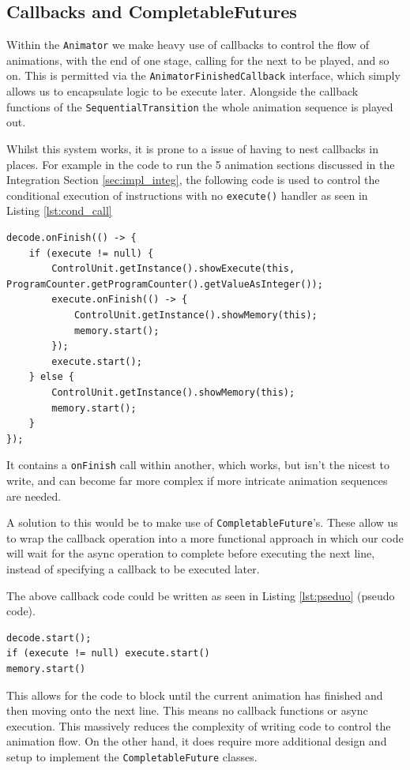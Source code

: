 \subsection{Callbacks and CompletableFutures}\label{sec:call_vs_cf}
Within the \texttt{Animator} we make heavy use of callbacks to control the flow of animations, with the end of one stage, calling for the next to be played, and so on. This is permitted via the \texttt{AnimatorFinishedCallback} interface, which simply allows us to encapsulate logic to be execute later. Alongside the callback functions of the \texttt{SequentialTransition} the whole animation sequence is played out.

Whilst this system works, it is prone to a issue of having to nest callbacks in places. For example in the code to run the 5 animation sections discussed in the Integration Section \ref{sec:impl_integ}, the following code is used to control the conditional execution of instructions with no \verb|execute()| handler as seen in Listing \ref{lst:cond_call}
\begin{lstlisting}[caption=Conditional callback execution, label=lst:cond_call]
decode.onFinish(() -> {
    if (execute != null) {
        ControlUnit.getInstance().showExecute(this, ProgramCounter.getProgramCounter().getValueAsInteger());
        execute.onFinish(() -> {
            ControlUnit.getInstance().showMemory(this);
            memory.start();
        });
        execute.start();
    } else {
        ControlUnit.getInstance().showMemory(this);
        memory.start();
    }
});
\end{lstlisting}
It contains a \verb|onFinish| call within another, which works, but isn't the nicest to write, and can become far more complex if more intricate animation sequences are needed.

A solution to this would be to make use of \texttt{CompletableFuture}'s. These allow us to wrap the callback operation into a more functional approach in which our code will wait for the async operation to complete before executing the next line, instead of specifying a callback to be executed later. 

The above callback code could be written as seen in Listing \ref{lst:pseduo} (pseudo code).
\begin{lstlisting}[caption=Functional pseduo code, label=lst:pseduo]
decode.start();
if (execute != null) execute.start()
memory.start()
\end{lstlisting}
This allows for the code to block until the current animation has finished and then moving onto the next line. This means no callback functions or async execution. This massively reduces the complexity of writing code to control the animation flow. On the other hand, it does require more additional design and setup to implement the \texttt{CompletableFuture} classes.

